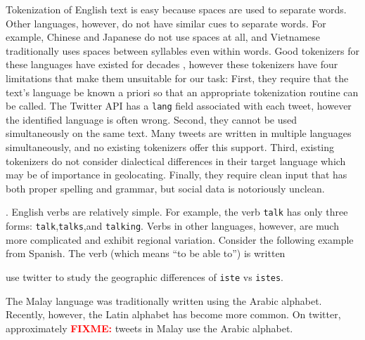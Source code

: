 \documentclass[sigconf,10pt]{acmart}
\newcommand{\str}[1]{\texttt{#1}}
\newcommand{\fixme}[1]{\textcolor{red}{\textbf{FIXME:} {#1}}}
\begin{document}
\begin{description}[style=unboxed,leftmargin=0cm]
    \item[Tokenization in multilingual corpora is difficult.]
        Tokenization of English text is easy because spaces are used to separate words.
        Other languages, however, do not have similar cues to separate words.
        For example, Chinese and Japanese do not use spaces at all,
        and Vietnamese traditionally uses spaces between syllables even within words.
        Good tokenizers for these languages have existed for decades \citep[e.g.][]{fung1998extracting,huyen2008hybrid},
        however these tokenizers have four limitations that make them unsuitable for our task:
        First, they require that the text's language be known a priori so that an appropriate tokenization routine can be called.
        The Twitter API has a \str{lang} field associated with each tweet,
        however the identified language is often wrong.
        Second, they cannot be used simultaneously on the same text.
        Many tweets are written in multiple languages simultaneously,
        and no existing tokenizers offer this support.
        Third, existing tokenizers do not consider dialectical differences in their target language which may be of importance in geolocating.
        Finally, they require clean input that has both proper spelling and grammar,
        but social data is notoriously unclean.

    \item[Verb conjugations].
        English verbs are relatively simple.
        For example, the verb \str{talk} has only three forms:
        \str{talk},\str{talks},and \str{talking}.
        Verbs in other languages, however, 
        are much more complicated and exhibit regional variation.
        Consider the following example from Spanish.
        The verb  (which means ``to be able to'') is written

        \citet{tinoco2017variation} use twitter to study the geographic differences of \str{iste} vs \str{istes}.

    \item[Languages with multiple writing systems.]
        The Malay language was traditionally written using the Arabic alphabet.
        Recently, however, the Latin alphabet has become more common.
        On twitter, approximately \fixme{} tweets in Malay use the Arabic alphabet.


\end{description}
\end{document}
